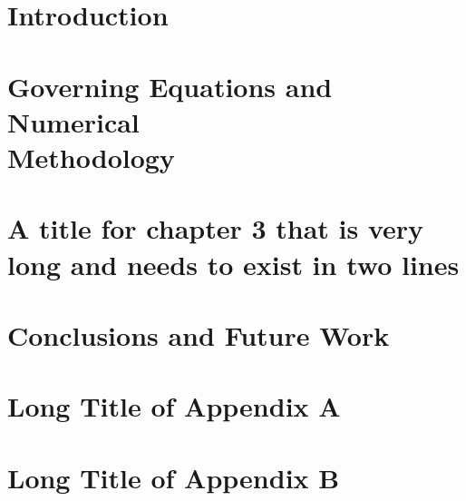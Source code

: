    \mainmatter

   \pagestyle{maintext}
   
   
   \chapter{Introduction}
   \label{ch:IntroductionLabel}
   

   \chapter[%
   Governing Equations and Numerical Methodology
   ]{%
      Governing Equations and Numerical\\Methodology
   }%
   \label{ch:2ndChapterLabel}
   

   \chapter[%
      Chapter 3 short title
   ]{%
      A title for chapter 3 that is very\\long and needs to exist in two lines
   }%
   \label{ch:3rdChapterLabel}
   


   \chapter[%
      Conclusion and Future Work
   ]{%
      Conclusions and Future Work
   }%
   \label{ch:7thChapterLabel}
   
   
   \appendix


   \chapter[%
      Appendix A 
   ]{%
      Long Title of Appendix A
   }%
   \label{ch:AppendixALabel}
   

   \chapter[%
      Appendix B 
   ]{%
      Long Title of Appendix B
   }%
   \label{ch:AppendixBLabel}
   
       
   \backmatter
   
   

   
   \renewcommand{\bibname}{References}
   

